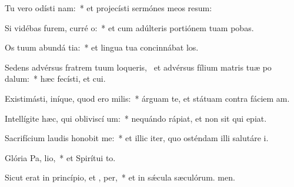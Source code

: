 \item Tu vero odísti nam:~* et projecísti sermónes meos resum:
\item Si vidébas furem, curré  o:~* et cum adúlteris portiónem tuam pobas.
\item Os tuum abundá tia:~* et lingua tua concinnábat los.
\item Sedens advérsus fratrem tuum loqueris,~\pscross{} et advérsus fílium matris tuæ po dalum:~* hæc fecísti, et cui.
\item Existimásti, iníque, quod ero  milis:~* árguam te, et státuam contra fáciem am.
\item Intellígite hæc, qui obliviscí um:~* nequándo rápiat, et non sit qui epiat.
\item Sacrifícium laudis honobit me:~* et illic iter, quo osténdam illi salutáre i.
\item Glória Pa,  lio,~* et Spirítui to.
\item Sicut erat in princípio, et ,  per,~* et in sǽcula sæculórum. men.
